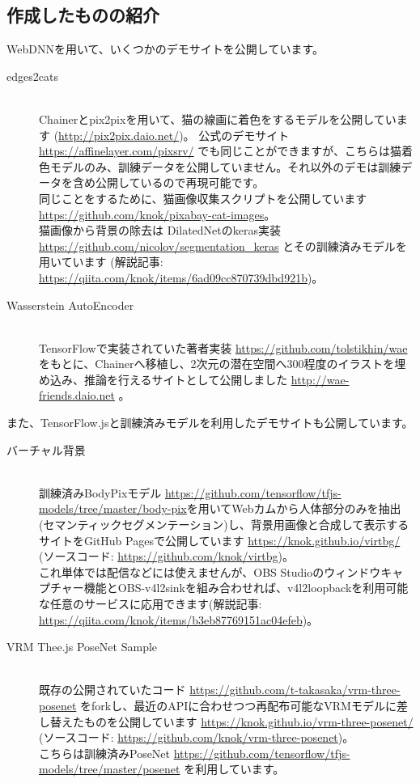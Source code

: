 \documentclass[mingoth,a4paper]{jsarticle}
\begin{document}
\subsection{作成したものの紹介}

WebDNNを用いて、いくつかのデモサイトを公開しています。

\begin{description}
\item[edges2cats] \mbox{} \\
  Chainerとpix2pixを用いて、猫の線画に着色をするモデルを公開しています (\url{http://pix2pix.daio.net/})。
  公式のデモサイト \url{https://affinelayer.com/pixsrv/} でも同じことができますが、こちらは猫着色モデルのみ、訓練データを公開していません。それ以外のデモは訓練データを含め公開しているので再現可能です。\\
  同じことをするために、猫画像収集スクリプトを公開しています \url{https://github.com/knok/pixabay-cat-images}。\\
  猫画像から背景の除去は DilatedNetのkeras実装 \url{https://github.com/nicolov/segmentation_keras} とその訓練済みモデルを用いています (解説記事: \url{https://qiita.com/knok/items/6ad09cc870739dbd921b})。
\item[Wasserstein AutoEncoder] \mbox{} \\
  TensorFlowで実装されていた著者実装 \url{https://github.com/tolstikhin/wae} をもとに、Chainerへ移植し、2次元の潜在空間へ300程度のイラストを埋め込み、推論を行えるサイトとして公開しました \url{http://wae-friends.daio.net} 。
\end{description}

また、TensorFlow.jsと訓練済みモデルを利用したデモサイトも公開しています。

\begin{description}
\item[バーチャル背景] \mbox{} \\
  訓練済みBodyPixモデル \url{https://github.com/tensorflow/tfjs-models/tree/master/body-pix}を用いてWebカムから人体部分のみを抽出(セマンティックセグメンテーション)し、背景用画像と合成して表示するサイトをGitHub Pagesで公開しています \url{https://knok.github.io/virtbg/} (ソースコード: \url{https://github.com/knok/virtbg})。\\
  これ単体では配信などには使えませんが、OBS Studioのウィンドウキャプチャー機能とOBS-v4l2sinkを組み合わせれば、v4l2loopbackを利用可能な任意のサービスに応用できます(解説記事: \url{https://qiita.com/knok/items/b3eb87769151ac04efeb})。\\
\item[VRM Thee.js PoseNet Sample] \mbox{} \\
  既存の公開されていたコード \url{https://github.com/t-takasaka/vrm-three-posenet} をforkし、最近のAPIに合わせつつ再配布可能なVRMモデルに差し替えたものを公開しています \url{https://knok.github.io/vrm-three-posenet/} (ソースコード: \url{https://github.com/knok/vrm-three-posenet})。\\
  こちらは訓練済みPoseNet \url{https://github.com/tensorflow/tfjs-models/tree/master/posenet} を利用しています。
\end{description}
\end{document}
